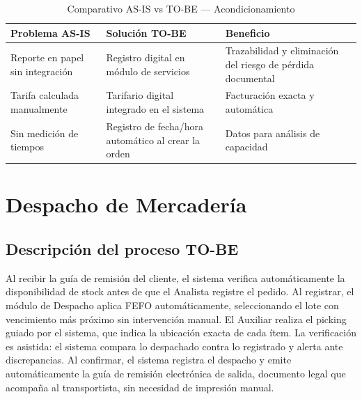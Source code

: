 \documentclass[11pt, a4paper, oneside]{report}
\begin{document}
\begin{table}[H]
\centering\small
\renewcommand{\arraystretch}{1.3}
\setlength{\tabcolsep}{4pt}
\begin{tabularx}{\textwidth}{|>{\raggedright\arraybackslash}p{}|>{\raggedright\arraybackslash}p{}|>{\raggedright\arraybackslash}X|}
\hline
\rowcolor{upeu_dark}
\color{white}\bfseries Problema AS-IS & \color{white}\bfseries Solución TO-BE & \color{white}\bfseries Beneficio \\ \hline
\rowcolor{gray!10}
Reporte en papel sin integración & Registro digital en módulo de servicios & Trazabilidad y eliminación del riesgo de pérdida documental \\ \hline
Tarifa calculada manualmente & Tarifario digital integrado en el sistema & Facturación exacta y automática \\ \hline
\rowcolor{gray!10}
Sin medición de tiempos & Registro de fecha/hora automático al crear la orden & Datos para análisis de capacidad \\ \hline
\end{tabularx}
\caption{Comparativo AS-IS vs TO-BE --- Acondicionamiento}
\end{table}

\section{Despacho de Mercadería}

\subsection{Descripción del proceso TO-BE}

Al recibir la guía de remisión del cliente, el sistema verifica automáticamente la disponibilidad de stock antes de que el Analista registre el pedido. Al registrar, el módulo de Despacho aplica FEFO automáticamente, seleccionando el lote con vencimiento más próximo sin intervención manual. El Auxiliar realiza el picking guiado por el sistema, que indica la ubicación exacta de cada ítem. La verificación es asistida: el sistema compara lo despachado contra lo registrado y alerta ante discrepancias. Al confirmar, el sistema registra el despacho y emite automáticamente la guía de remisión electrónica de salida, documento legal que acompaña al transportista, sin necesidad de impresión manual.
\end{document}
